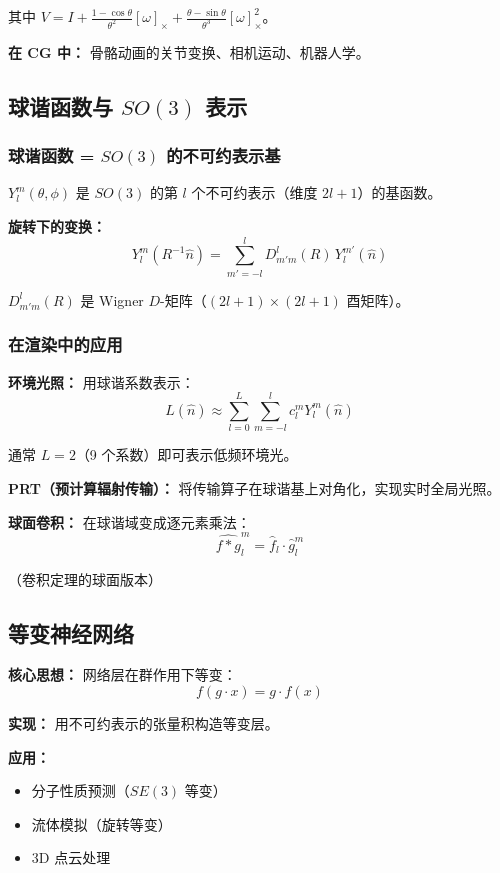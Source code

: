 其中 $V = I + \frac{1-\cos\theta}{\theta^2}[\omega]_\times + \frac{\theta - \sin\theta}{\theta^3}[\omega]_\times^2$。

\textbf{在 CG 中：} 骨骼动画的关节变换、相机运动、机器人学。

\subsection{球谐函数与 $SO(3)$ 表示}

\subsubsection{球谐函数 = $SO(3)$ 的不可约表示基}

$Y_l^m(\theta, \phi)$ 是 $SO(3)$ 的第 $l$ 个不可约表示（维度 $2l+1$）的基函数。

\textbf{旋转下的变换：}
\[
Y_l^m(R^{-1}\hat{n}) = \sum_{m'=-l}^{l} D^l_{m'm}(R)\, Y_l^{m'}(\hat{n})
\]

$D^l_{m'm}(R)$ 是 Wigner $D$-矩阵（$(2l+1) \times (2l+1)$ 酉矩阵）。

\subsubsection{在渲染中的应用}

\textbf{环境光照：} 用球谐系数表示：
\[
L(\hat{n}) \approx \sum_{l=0}^{L}\sum_{m=-l}^{l} c_l^m Y_l^m(\hat{n})
\]

通常 $L = 2$（9 个系数）即可表示低频环境光。

\textbf{PRT（预计算辐射传输）：} 将传输算子在球谐基上对角化，实现实时全局光照。

\textbf{球面卷积：} 在球谐域变成逐元素乘法：
\[
\widehat{f * g}_l^m = \hat{f}_l \cdot \hat{g}_l^m
\]

（卷积定理的球面版本）

\subsection{等变神经网络}

\textbf{核心思想：} 网络层在群作用下等变：
\[
f(g \cdot x) = g \cdot f(x)
\]

\textbf{实现：} 用不可约表示的张量积构造等变层。

\textbf{应用：}
\begin{itemize}
  \item 分子性质预测（$SE(3)$ 等变）
  \item 流体模拟（旋转等变）
  \item 3D 点云处理
\end{itemize}

